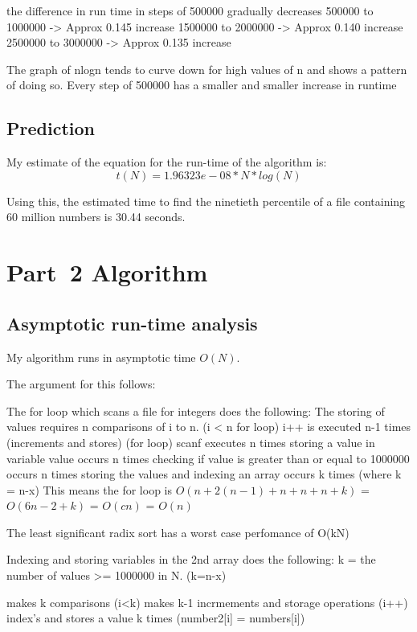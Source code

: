 \documentclass{article}
\begin{document}
the difference in run time in steps of 500000 gradually decreases
500000 to 1000000 -> Approx 0.145 increase
1500000 to 2000000 -> Approx 0.140 increase
2500000 to 3000000 -> Approx 0.135 increase

The graph of nlogn tends to curve down for high values of n and shows a pattern
of doing so. Every step of 500000 has a smaller and smaller increase in runtime
\subsection{Prediction}
\label{sec:prediction1}
My estimate of the equation for the run-time of the algorithm is:
\begin{equation}
  \label{eq:estimated_runtime1}
   t(N) = 1.96323e-08*N*log(N)
\end{equation}

Using this, the estimated time to find the ninetieth percentile of a
file containing 60 million numbers is 30.44 seconds.


\section{Part~2 Algorithm}
\label{sec:algorithm2}

\subsection{Asymptotic run-time analysis}

My algorithm runs in asymptotic time $O(N)$. 

The argument for this follows:

The for loop which scans a file for integers does the following:
The storing of values requires n comparisons of i to n. (i < n for loop)
i++ is executed n-1 times (increments and stores) (for loop)
scanf executes n times
storing a value in variable value occurs n times
checking if value is greater than or equal to 1000000 occurs n times
storing the values and indexing an array occurs k times (where k = n-x)
This means the for loop is $O(n + 2(n-1) + n + n + n + k)$ = $O(6n-2 + k)$ = $O(cn)$ = $O(n)$

The least significant radix sort has a worst case perfomance of O(kN)

Indexing and storing variables in the 2nd array does the following:
k = the number of values >= 1000000 in N. (k=n-x)

makes k comparisons (i<k)
makes k-1 incrmements and storage operations (i++)
index's and stores a value k times (number2[i] = numbers[i])
\end{document}
